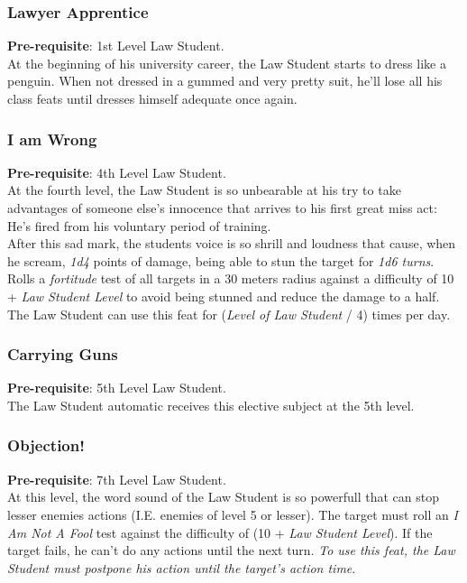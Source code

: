 \documentclass[ letterpaper,12pt]{article}
\begin{document}
\subsubsection{Lawyer Apprentice}
{\bf Pre-requisite}: 1st Level Law Student.\\
  At the beginning of his university career, the Law Student starts to dress like a penguin. When not dressed in a gummed and very pretty suit, he'll lose all his class feats until dresses himself adequate once again.

\subsubsection{I am Wrong}
{\bf Pre-requisite}: 4th Level Law Student.\\
At the fourth level, the Law Student is so unbearable at his try to take advantages of someone else's innocence that arrives to his first great miss act: He's fired from his voluntary period of training.\\
After this sad mark, the students voice is so shrill and loudness that cause, when he scream, {\it 1d4} points of damage, being able to stun the target for {\it 1d6 turns}. Rolls a {\it fortitude} test of all targets in a 30 meters radius against a difficulty of 10 + {\it Law Student Level} to avoid being stunned and reduce the damage to a half.\\
The Law Student can use this feat for ({\it Level of Law Student} / 4) times per day.

\subsubsection{Carrying Guns}
{\bf Pre-requisite}: 5th Level Law Student.\\
The Law Student automatic receives this elective subject at the 5th level.

\subsubsection{Objection!}
{\bf Pre-requisite}: 7th Level Law Student.\\
At this level, the word sound of the Law Student is so powerfull that can stop lesser enemies actions (I.E. enemies of level 5 or lesser). The target must roll an {\it I Am Not A Fool} test against the difficulty of (10 + {\it Law Student Level}). If the target fails, he can't do any actions until the next turn. {\it To use this feat, the Law Student must postpone his action until the target's action time}.
\end{document}
